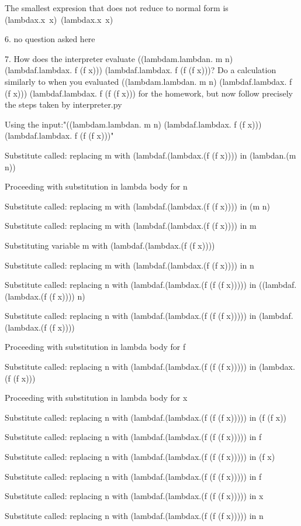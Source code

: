 \documentclass{article}
\theoremstyle{theorem}
\theoremstyle{definition}
\theoremstyle{remark}
\begin{document}
The smallest expresion that does not reduce to normal form is (lambdax.x x) (lambdax.x x)

6. no question asked here

7. How does the interpreter evaluate ((lambdam.lambdan. m n) (lambdaf.lambdax. f (f x))) (lambdaf.lambdax. f (f (f x)))? Do a calculation similarly to when you evaluated ((lambdam.lambdan. m n) (lambdaf.lambdax. f (f x))) (lambdaf.lambdax. f (f (f x))) for the homework, but now follow precisely the steps taken by interpreter.py

Using the input:"((lambdam.lambdan. m n) (lambdaf.lambdax. f (f x))) (lambdaf.lambdax. f (f (f x)))"

Substitute called: replacing m with (lambdaf.(lambdax.(f (f x)))) in (lambdan.(m n))

Proceeding with substitution in lambda body for n

Substitute called: replacing m with (lambdaf.(lambdax.(f (f x)))) in (m n)

Substitute called: replacing m with (lambdaf.(lambdax.(f (f x)))) in m

Substituting variable m with (lambdaf.(lambdax.(f (f x))))

Substitute called: replacing m with (lambdaf.(lambdax.(f (f x)))) in n

Substitute called: replacing n with (lambdaf.(lambdax.(f (f (f x))))) in ((lambdaf.(lambdax.(f (f x)))) n)

Substitute called: replacing n with (lambdaf.(lambdax.(f (f (f x))))) in (lambdaf.(lambdax.(f (f x))))

Proceeding with substitution in lambda body for f

Substitute called: replacing n with (lambdaf.(lambdax.(f (f (f x))))) in (lambdax.(f (f x)))

Proceeding with substitution in lambda body for x

Substitute called: replacing n with (lambdaf.(lambdax.(f (f (f x))))) in (f (f x))

Substitute called: replacing n with (lambdaf.(lambdax.(f (f (f x))))) in f

Substitute called: replacing n with (lambdaf.(lambdax.(f (f (f x))))) in (f x)

Substitute called: replacing n with (lambdaf.(lambdax.(f (f (f x))))) in f

Substitute called: replacing n with (lambdaf.(lambdax.(f (f (f x))))) in x

Substitute called: replacing n with (lambdaf.(lambdax.(f (f (f x))))) in n
\end{document}
